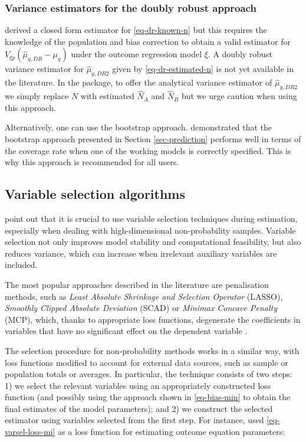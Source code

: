 \documentclass[
]{jss}
\begin{document}
\subsubsection{Variance estimators for the doubly robust
approach}\label{variance-estimators-for-the-doubly-robust-approach}

\citet{yang_doubly_2020} derived a closed form estimator for
\eqref{eq-dr-known-n} but this requires the knowledge of the population
and bias correction to obtain a valid estimator for
\(V_{\xi p}\left(\hat{\mu}_{y,DR}-\mu_y\right)\) under the outcome
regression model \(\xi\). A doubly robust variance estimator for
\(\hat{\mu}_{y,DR2}\) given by \eqref{eq-dr-estimated-n} is not yet
available in the literature. In the package, to offer the analytical
variance estimator of \(\hat{\mu}_{y,DR2}\) we simply replace \(N\) with
estimated \(\hat{N}_A\) and \(\hat{N}_B\) but we urge caution when using
this approach.

Alternatively, one can use the bootstrap approach.
\citet{chen2020doubly} demonstrated that the bootstrap approach
presented in Section \ref{sec-prediction} performs well in terms of the
coverage rate when one of the working models is correctly specified.
This is why this approach is recommended for all users.

\subsection{Variable selection algorithms}\label{sec-varsel}

\citet{yang_asymptotic_2020} point out that it is crucial to use
variable selection techniques during estimation, especially when dealing
with high-dimensional non-probability samples. Variable selection not
only improves model stability and computational feasibility, but also
reduces variance, which can increase when irrelevant auxiliary variables
are included.

The most popular approaches described in the literature are penalisation
methods, such as
\textit{Least Absolute Shrinkage and Selection Operator} (LASSO),
\textit{Smoothly Clipped Absolute Deviation} (SCAD) or
\textit{Minimax Concave Penalty} (MCP), which, thanks to appropriate
loss functions, degenerate the coefficients in variables that have no
significant effect on the dependent variable
\citep[cf.][]{tibshirani1996regression, ncvreg}.

The selection procedure for non-probability methods works in a similar
way, with loss functions modified to account for external data sources,
such as sample or population totals or averages. In particular, the
technique consists of two steps: 1) we select the relevant variables
using an appropriately constructed loss function (and possibly using the
approach shown in \eqref{eq-bias-min} to obtain the final estimates of
the model parameters); and 2) we construct the selected estimator using
variables selected from the first step. For instance,
\citet{yang_doubly_2020} used \eqref{eq-varsel-loss-mi} as a loss
function for estimating outcome equation parameters:
\end{document}
